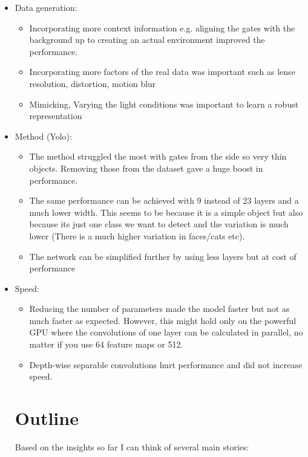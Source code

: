 \documentclass{article}
\begin{document}
\begin{itemize}
	\item Data generation:
	\begin{itemize}
		\item Incorporating more context information e.g. aligning the gates with the background up to creating an actual environment improved the performance.
		\item Incorporating more factors of the real data was important such as lense resolution, distortion, motion blur
		\item Mimicking, Varying the light conditions was important to learn a robust representation
	\end{itemize}  
	\item Method (Yolo):
	\begin{itemize}
		\item The method struggled the most with gates from the side so very thin objects. Removing those from the dataset gave a huge boost in performance.
		\item The same performance can be achieved with 9 instead of 23 layers and a much lower width. This seems to be because it is a simple object but also because its just one class we want to detect and the variation is much lower (There is a much higher variation in faces/cats etc).
		\item The network can be simplified further by using less layers but at cost of performance
	\end{itemize}
	\item Speed:
	\begin{itemize}
		\item Reducing the number of parameters made the model faster but not as much faster as expected. However, this might hold only on the powerful GPU where the convolutions of one layer can be calculated in parallel, no matter if you use 64 feature maps or 512.
		\item Depth-wise separable convolutions hurt performance and did not increase speed.
	\end{itemize}

\section{Outline}

Based on the insights so far I can think of several main stories:

\begin{itemize}
	

\end{itemize}
\end{itemize}
\end{document}
